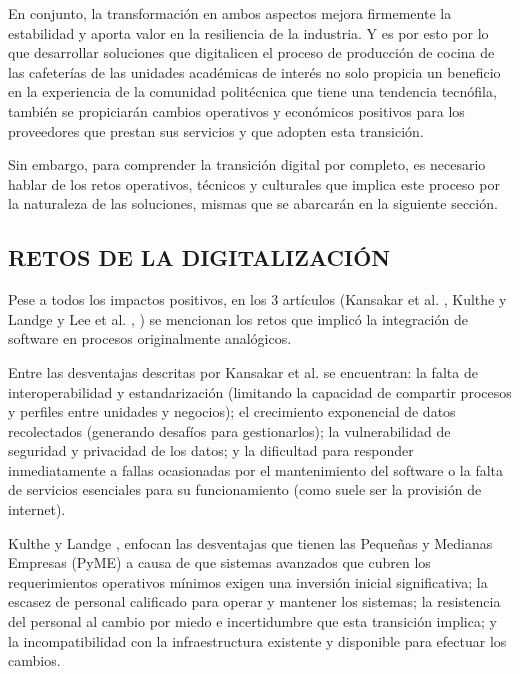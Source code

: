 En conjunto, la transformación en ambos aspectos mejora firmemente la estabilidad y aporta valor en la resiliencia de la industria. Y es por esto por lo que desarrollar soluciones que digitalicen el proceso de producción de cocina de las cafeterías de las unidades académicas de interés no solo propicia un beneficio en la experiencia de la comunidad politécnica que tiene una tendencia tecnófila, también se propiciarán cambios operativos y económicos positivos para los proveedores que prestan sus servicios y que adopten esta transición. 

Sin embargo, para comprender la transición digital por completo, es necesario hablar de los retos operativos, técnicos y culturales que implica este proceso por la naturaleza de las soluciones, mismas que se abarcarán en la siguiente sección.

\subsection{RETOS DE LA DIGITALIZACIÓN}

Pese a todos los impactos positivos, en los 3 artículos (Kansakar et al. \cite{kansakar2018technology}, Kulthe y Landge \cite{kulthe2025adoption} y Lee et al. \cite{woojin2024effect}, \cite{woojin2026multifaceted}) se mencionan los retos que implicó la integración de software en procesos originalmente analógicos.

Entre las desventajas descritas por Kansakar et al. \cite{kansakar2018technology} se encuentran: la falta de interoperabilidad y estandarización (limitando la capacidad de compartir procesos y perfiles entre unidades y negocios); el crecimiento exponencial de datos recolectados (generando desafíos para gestionarlos); la vulnerabilidad de seguridad y privacidad de los datos; y la dificultad para responder inmediatamente a fallas ocasionadas por el mantenimiento del software o la falta de servicios esenciales para su funcionamiento (como suele ser la provisión de internet).  

Kulthe y Landge \cite{kulthe2025adoption}, enfocan las desventajas que tienen las Pequeñas y Medianas Empresas (PyME) a causa de que sistemas avanzados que cubren los requerimientos operativos mínimos exigen una inversión inicial significativa; la escasez de personal calificado para operar y mantener los sistemas; la resistencia del personal al cambio por miedo e incertidumbre que esta transición implica; y la incompatibilidad con la infraestructura existente y disponible para efectuar los cambios. 

